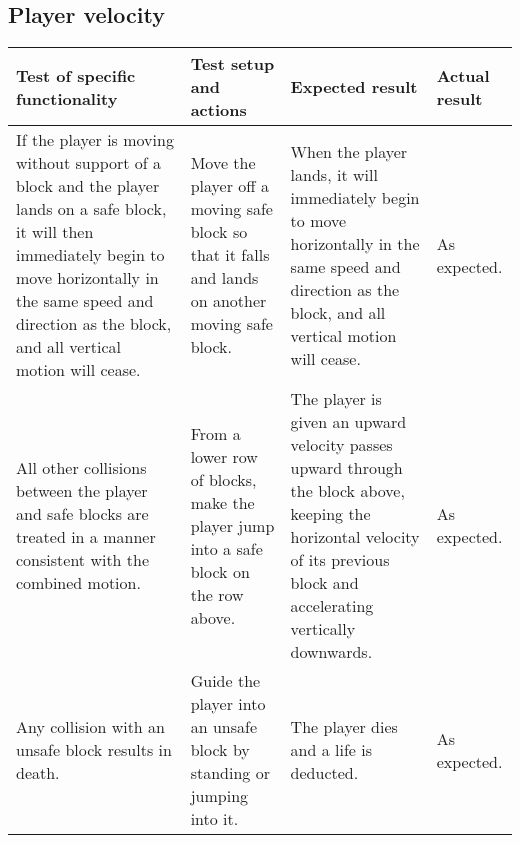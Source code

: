 \documentclass[10pt, titlepage]{article}
\newenvironment{testplan}[1]
{
\newcommand{\test}[4]{\midrule ##1 & ##2 & ##3 & ##4 \\}
\subsection{#1}
\begin{longtable}{L{0.3\textwidth}L{0.2\textwidth}L{0.25\textwidth}L{0.15\textwidth}}
\toprule
\textbf{Test of specific functionality} & \textbf{Test setup and actions} & \textbf{Expected result} & \textbf{Actual result} \\
}
{
\bottomrule
\end{longtable}
}
\begin{document}
\begin{testplan}{Player velocity}
\test{If the player is moving without support of a block and the player lands on a safe block, it will then immediately begin to move horizontally in the same speed and direction as the block, and all vertical motion will cease.}{Move the player off a moving safe block so that it falls and lands on another moving safe block.}{When the player lands, it will immediately begin to move horizontally in the same speed and direction as the block, and all vertical motion will cease.}{As expected.}
\test{All other collisions between the player and safe blocks are treated in a manner consistent with the combined motion.}{From a lower row of blocks, make the player jump into a safe block on the row above.}{The player is given an upward velocity passes upward through the block above, keeping the horizontal velocity of its previous block and accelerating vertically downwards.}{As expected.}
\test{Any collision with an unsafe block results in death.}{Guide the player into an unsafe block by standing or jumping into it.}{The player dies and a life is deducted.}{As expected.}
\end{testplan}
\end{document}
